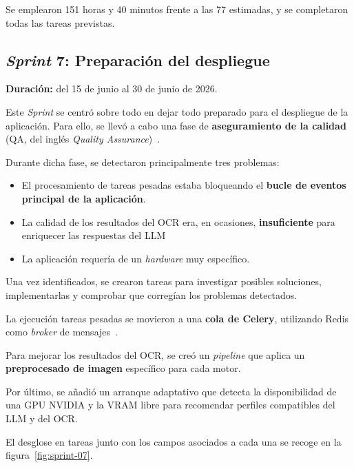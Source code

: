 
Se emplearon 151 horas y 40 minutos frente a las 77 estimadas, y se
completaron todas las tareas previstas.

\subsection{\textit{Sprint} 7: Preparación del despliegue}
\textbf{Duración:} del 15 de junio al 30 de junio de 2026.

Este \textit{Sprint} se centró sobre todo en dejar todo preparado para el despliegue
de la aplicación. Para ello, se llevó a cabo una fase de
\textbf{aseguramiento de la calidad} (\acs{QA}, del inglés
\textit{Quality Assurance})~\cite{iso_quality_assurance}.

Durante dicha fase, se detectaron principalmente tres problemas:

\begin{itemize}
    \item El procesamiento de tareas pesadas estaba bloqueando el
    \textbf{bucle de eventos principal de la aplicación}.
    \item La calidad de los resultados del \ac{OCR} era, en ocasiones,
    \textbf{insuficiente} para enriquecer las respuestas del \ac{LLM}
    \item La aplicación requería de un \textit{hardware} muy específico.
\end{itemize}

Una vez identificados, se crearon tareas para investigar posibles soluciones,
implementarlas y comprobar que corregían los problemas detectados.

La ejecución tareas pesadas se movieron a una \textbf{cola de Celery}, utilizando Redis como \textit{broker} de mensajes~\cite{celery_introduction}.

Para mejorar los resultados del \ac{OCR}, se creó un \textit{pipeline} que
aplica un \textbf{preprocesado de imagen} específico para cada motor.

Por último, se añadió un arranque adaptativo que detecta la disponibilidad de
una GPU NVIDIA y la VRAM libre para recomendar perfiles compatibles del \ac{LLM}
y del \ac{OCR}.

El desglose en tareas junto con los campos asociados a cada una se
recoge en la figura~\ref{fig:sprint-07}.



